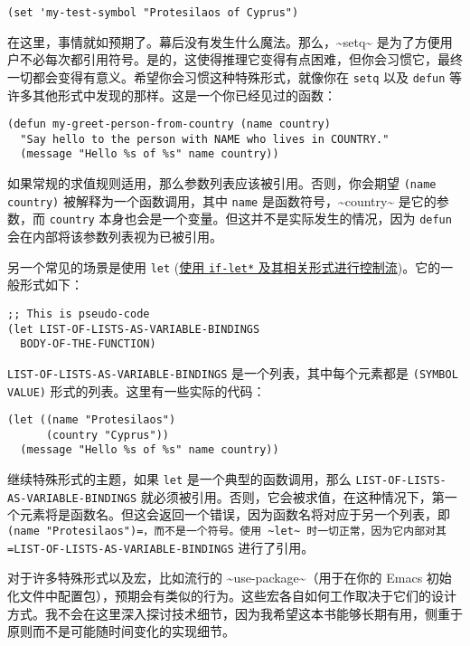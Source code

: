 \documentclass[11pt]{ctexart}
\begin{document}
\begin{verbatim}
(set 'my-test-symbol "Protesilaos of Cyprus")
\end{verbatim}

在这里，事情就如预期了。幕后没有发生什么魔法。那么，\textasciitilde{}setq\textasciitilde{} 是为了方便用户不必每次都引用符号。是的，这使得推理它变得有点困难，但你会习惯它，最终一切都会变得有意义。希望你会习惯这种特殊形式，就像你在 \texttt{setq} 以及 \texttt{defun} 等许多其他形式中发现的那样。这是一个你已经见过的函数：

\begin{verbatim}
(defun my-greet-person-from-country (name country)
  "Say hello to the person with NAME who lives in COUNTRY."
  (message "Hello %s of %s" name country))
\end{verbatim}

如果常规的求值规则适用，那么参数列表应该被引用。否则，你会期望 \texttt{(name country)} 被解释为一个函数调用，其中 \texttt{name} 是函数符号，\textasciitilde{}country\textasciitilde{} 是它的参数，而 \texttt{country} 本身也会是一个变量。但这并不是实际发生的情况，因为 \texttt{defun} 会在内部将该参数列表视为已被引用。

另一个常见的场景是使用 \texttt{let} (\hyperref[sec:org795b8c4]{使用 \texttt{if-let*} 及其相关形式进行控制流})。它的一般形式如下：

\begin{verbatim}
;; This is pseudo-code
(let LIST-OF-LISTS-AS-VARIABLE-BINDINGS
  BODY-OF-THE-FUNCTION)
\end{verbatim}

\texttt{LIST-OF-LISTS-AS-VARIABLE-BINDINGS} 是一个列表，其中每个元素都是 \texttt{(SYMBOL VALUE)} 形式的列表。这里有一些实际的代码：

\begin{verbatim}
(let ((name "Protesilaos")
      (country "Cyprus"))
  (message "Hello %s of %s" name country))
\end{verbatim}

继续特殊形式的主题，如果 \texttt{let} 是一个典型的函数调用，那么 \texttt{LIST-OF-LISTS-AS-VARIABLE-BINDINGS} 就必须被引用。否则，它会被求值，在这种情况下，第一个元素将是函数名。但这会返回一个错误，因为函数名将对应于另一个列表，即 \texttt{(name "Protesilaos")=，而不是一个符号。使用 \textasciitilde{}let\textasciitilde{} 时一切正常，因为它内部对其 =LIST-OF-LISTS-AS-VARIABLE-BINDINGS} 进行了引用。

对于许多特殊形式以及宏，比如流行的 \textasciitilde{}use-package\textasciitilde{}（用于在你的 Emacs 初始化文件中配置包），预期会有类似的行为。这些宏各自如何工作取决于它们的设计方式。我不会在这里深入探讨技术细节，因为我希望这本书能够长期有用，侧重于原则而不是可能随时间变化的实现细节。
\end{document}
